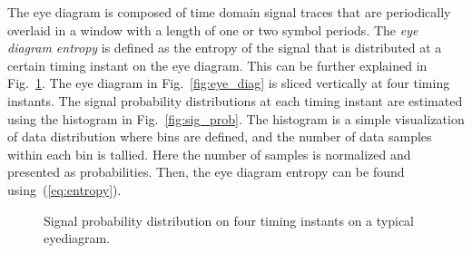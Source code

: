 \documentclass[journal,comsoc]{IEEEtran}
\begin{document}
The eye diagram is composed of time domain signal traces that are periodically overlaid in a window with a length of one or two symbol periods.
The \textit{eye diagram entropy} is defined as the entropy of the signal that is distributed at a certain timing instant on the eye diagram. 
This can be further explained in Fig.~\ref{fig:eye_ent}.
The eye diagram in Fig.~\ref{fig:eye_diag} is sliced vertically at four timing instants.
The signal probability distributions at each timing instant are estimated using the histogram in Fig.~\ref{fig:sig_prob}.
The histogram is a simple visualization of data distribution where bins are defined, and the number of data samples within each bin is tallied. 
Here the number of samples is normalized and presented as probabilities.
Then, the eye diagram entropy can be found using~(\ref{eq:entropy}). 
\begin{figure}[htbp]
\centering
{}
\caption{Signal probability distribution on four timing instants on a typical eyediagram.}
\label{fig:eye_ent} %
\end{figure}
\end{document}
